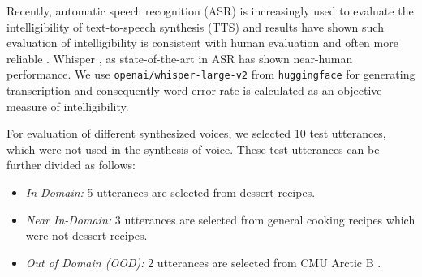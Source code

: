 \documentclass[lettersize,journal]{IEEEtran}
\begin{document}
Recently, automatic speech recognition (ASR) is increasingly used to evaluate the intelligibility of text-to-speech synthesis (TTS) and results have shown such evaluation of intelligibility is consistent with human evaluation and often more reliable \cite{asr_tts}. Whisper \cite{radford2022whisper}, as state-of-the-art in ASR has shown near-human performance. We use \verb|openai/whisper-large-v2| from \verb|huggingface| for generating transcription and consequently word error rate is calculated as an objective measure of intelligibility.





For evaluation of different synthesized voices, we selected 10 test utterances, which were not used in the synthesis of voice. These test utterances can be further divided as follows:
\begin{itemize}
    \item \textit{In-Domain:} 5 utterances are selected from dessert recipes.
    \item \textit{Near In-Domain:} 3 utterances are selected from general cooking recipes which were not dessert recipes.
    \item \textit{Out of Domain (OOD):} 2 utterances are selected from CMU Arctic B \cite{Kominek2004TheCA}.
\end{itemize}
\end{document}
